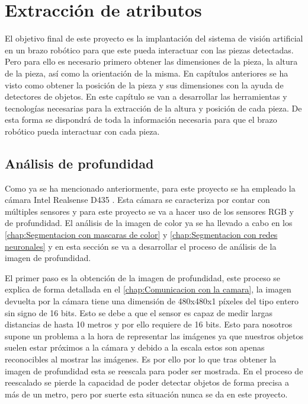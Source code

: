 \chapter{Extracción de atributos}
\label{chap:Extraccion de atributos}

El objetivo final de este proyecto es la implantación del sistema de visión artificial en un brazo robótico para que este pueda interactuar con las piezas detectadas. Pero para ello es necesario primero obtener las dimensiones de la pieza, la altura de la pieza, así como la orientación de la misma. En capítulos anteriores se ha visto como obtener la posición de la pieza y sus dimensiones con la ayuda de detectores de objetos. En este capítulo se van a desarrollar las herramientas y tecnologías necesarias para la extracción de la altura y posición de cada pieza. De esta forma se dispondrá de toda la información necesaria para que el brazo robótico pueda interactuar con cada pieza.

\section{Análisis de profundidad}
Como ya se ha mencionado anteriormente, para este proyecto se ha empleado la cámara Intel Realsense D435 \citep{IntelD435}. Esta cámara se caracteriza por contar con múltiples sensores y para este proyecto se va a hacer uso de los sensores RGB y de profundidad. El análisis de la imagen de color ya se ha llevado a cabo en los \autoref{chap:Segmentacion con mascaras de color} y \autoref{chap:Segmentacion con redes neuronales} y en esta sección se va a desarrollar el proceso de análisis de la imagen de profundidad.

El primer paso es la obtención de la imagen de profundidad, este proceso se explica de forma detallada en el \autoref{chap:Comunicacion con la camara}, la imagen devuelta por la cámara tiene una dimensión de 480x480x1 píxeles del tipo entero sin signo de 16 bits. Esto se debe a que el sensor es capaz de medir largas distancias de hasta 10 metros y por ello requiere de 16 bits. Esto para nosotros supone un problema a la hora de representar las imágenes ya que nuestros objetos suelen estar próximos a la cámara y debido a la escala estos son apenas reconocibles al mostrar las imágenes. Es por ello por lo que tras obtener la imagen de profundidad esta se reescala para poder ser mostrada. En el proceso de reescalado se pierde la capacidad de poder detectar objetos de forma precisa a más de un metro, pero por suerte esta situación nunca se da en este proyecto.
	

